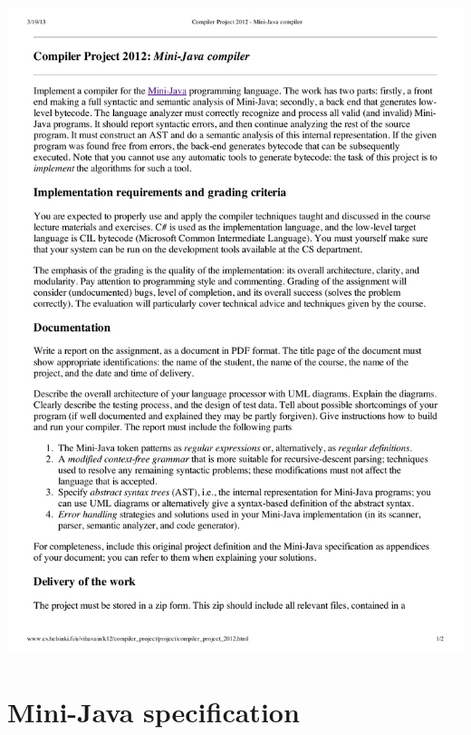 \documentclass[a4paper,11pt]{article}
\begin{document}
\includegraphics[width=1.0\textwidth,page=2]{project.pdf}

\section{Mini-Java specification}
\end{document}
